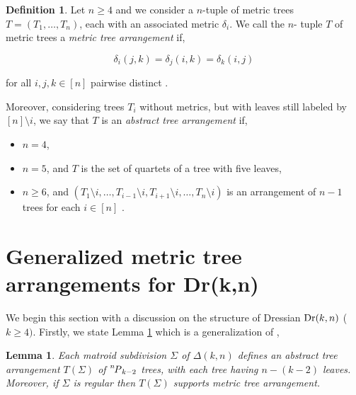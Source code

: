 \documentclass[10pt,a4paper]{amsart}
\DeclareMathOperator{\Dr}{\rm Dr}
\newcommand\Myperm[2][^n]{\prescript{#1\mkern-2.5mu}{}P_{#2}}
\theoremstyle{plain}
\newtheorem{lemma}[theorem]{Lemma}
\theoremstyle{definition}
\newtheorem{definition}[theorem]{Definition}
\numberwithin{subcase}{case}
\begin{document}
\setcounter{theorem}{8}
\begin{definition}

Let $n \geq 4$ and we consider a $n$-tuple of metric trees $T = (T_{1}, \hdots , T_{n})$, each with an associated metric $\delta_{i}$. We call the $n$- tuple $T$ of metric trees a \emph{metric tree arrangement} if, 

\[ \delta_{i}(j,k) = \delta_{j}(i,k) =\delta_{k}(i,j) \]

for all $i,j,k \in [n]$ pairwise distinct \cite{herrmann2009draw}.

Moreover, considering trees $T_{i}$ without metrics, but
with leaves still labeled by $[n] \setminus {i}$, we say that $T$ is an \emph{abstract tree arrangement} if,

\begin{itemize}
    \item $n =4$,
    \item $n = 5$, and $T$ is the set of quartets of a tree with five leaves,
    \item $n \geq 6$, and $(T_{1} \setminus i, \hdots , T_{i-1} \setminus i, T_{i+1} \setminus i, \hdots , T_{n} \setminus i)$ is an arrangement of $n - 1$ trees for each $i \in [n]$ \cite{herrmann2009draw}.
\end{itemize}

\end{definition}

\setcounter{theorem}{18}
\section{Generalized metric tree arrangements for Dr(k,n)}\label{sec:Section_4}

We begin this section with a discussion on the structure of Dressian  
$\Dr(k,n)$ ($k \geq 4)$. Firstly, we state Lemma \ref{lem:mat_sub_k,n} which is a generalization of \cite[Lemma 4.3]{herrmann2009draw},

\begin{lemma}\label{lem:mat_sub_k,n}
Each matroid subdivision $\Sigma$ of $\Delta(k,n)$ defines an abstract tree arrangement $T(\Sigma)$ of $\Myperm[n]{k-2}$ trees, with each tree having $n-(k-2)$ leaves. Moreover, if $\Sigma$ is regular then $T(\Sigma)$ supports metric tree arrangement.
\end{lemma}
\end{document}
